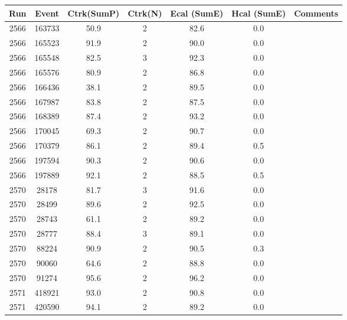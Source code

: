 \begin{tabular}{ccccccl}
	\toprule
	Run & Event & Ctrk(SumP) & Ctrk(N) & Ecal (SumE) & Hcal (SumE) & Comments \\
	\midrule
	2566 & 163733 & 50.9       & 2       & 82.6       & 0.0        &  \\
	2566 & 165523 & 91.9       & 2       & 90.0       & 0.0        &  \\
	2566 & 165548 & 82.5       & 3       & 92.3       & 0.0        &  \\
	2566 & 165576 & 80.9       & 2       & 86.8       & 0.0        &  \\
	2566 & 166436 & 38.1       & 2       & 89.5       & 0.0        &  \\
	2566 & 167987 & 83.8       & 2       & 87.5       & 0.0        &  \\
	2566 & 168389 & 87.4       & 2       & 93.2       & 0.0        &  \\
	2566 & 170045 & 69.3       & 2       & 90.7       & 0.0        &  \\
	2566 & 170379 & 86.1       & 2       & 89.4       & 0.5        &  \\
	2566 & 197594 & 90.3       & 2       & 90.6       & 0.0        &  \\
	2566 & 197889 & 92.1       & 2       & 88.5       & 0.5        &  \\
	2570 & 28178  & 81.7       & 3       & 91.6       & 0.0        &  \\
	2570 & 28499  & 89.6       & 2       & 92.5       & 0.0        &  \\
	2570 & 28743  & 61.1       & 2       & 89.2       & 0.0        &  \\
	2570 & 28777  & 88.4       & 3       & 89.1       & 0.0        &  \\
	2570 & 88224  & 90.9       & 2       & 90.5       & 0.3        &  \\
	2570 & 90060  & 64.6       & 2       & 88.8       & 0.0        &  \\
	2570 & 91274  & 95.6       & 2       & 96.2       & 0.0        &  \\
	2571 & 418921 & 93.0       & 2       & 90.8       & 0.0        &  \\
	2571 & 420590 & 94.1       & 2       & 89.2       & 0.0        &  \\
	\bottomrule
\end{tabular}
